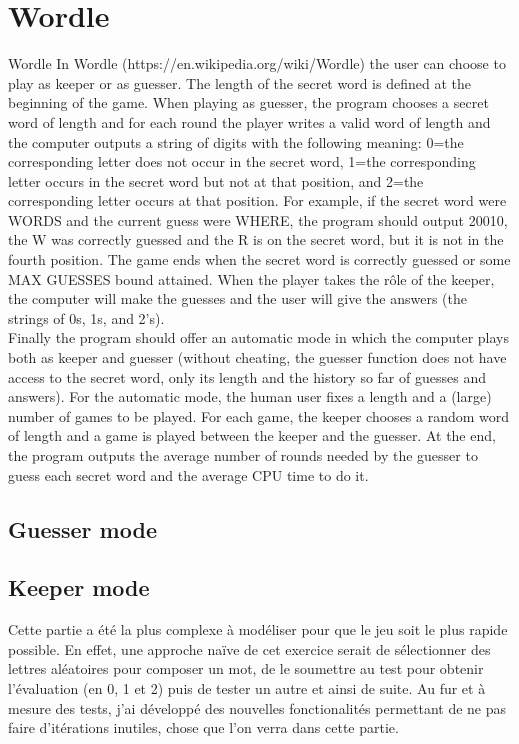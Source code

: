 \documentclass[10pt,a4paper,hidelinks]{article}
\begin{document}
\section{Wordle}
\begin{exercise_description}{Wordle}
In Wordle (https://en.wikipedia.org/wiki/Wordle) the user can choose to play as keeper or as guesser. The length of the secret word is defined at the beginning of the game. When playing as guesser, the program chooses a secret word of length and for each round the player writes a valid word of length and the computer outputs a string of digits with the following meaning: 0=the corresponding letter does not occur in the secret word, 1=the corresponding letter occurs in the secret word but not at that position, and 2=the corresponding letter occurs at that position. For example, if the secret word were WORDS and the current guess were WHERE, the program should output 20010, the W was correctly guessed and the R is on the secret word, but it is not in the fourth position. The game ends when the secret word is correctly guessed or some MAX GUESSES bound attained. When the player takes the rôle of the keeper, the computer will make the guesses and the user will give the answers (the strings of 0s, 1s, and 2’s).\\

Finally the program should offer an automatic mode in which the computer plays both as keeper and guesser (without cheating, the guesser function does not have access to the secret word, only its length and the history so far of guesses and answers). For the automatic mode, the human user fixes a length and a (large) number of games to be played. For each game, the keeper chooses a random word of length and a game is played between the keeper and the guesser. At the end, the program outputs the average number of rounds needed by the guesser to guess each secret word and the average CPU time to do it.     
\end{exercise_description}
\subsection{Guesser mode}

\subsection{Keeper mode}
Cette partie a été la plus complexe à modéliser pour que le jeu soit le plus rapide possible. En effet, une approche naïve de cet exercice serait de sélectionner des lettres aléatoires pour composer un mot, de le soumettre au test pour obtenir l'évaluation (en 0, 1 et 2) puis de tester un autre et ainsi de suite. Au fur et à mesure des tests, j'ai développé des nouvelles fonctionalités permettant de ne pas faire d'itérations inutiles, chose que l'on verra dans cette partie.
\end{document}
